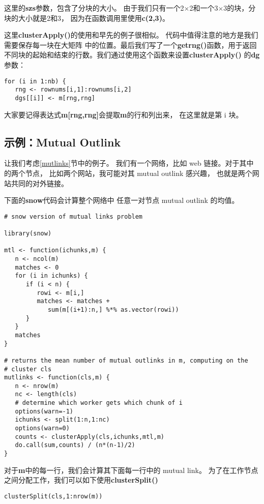 这里的{\bf szs}参数，包含了分块的大小。
由于我们只有一个2$\times$2和一个3$\times$3的块，分块的大小就是2和3，
因为在函数调用里使用{\bf c(2,3)}。

这里{\bf clusterApply()}的使用和早先的例子很相似。
代码中值得注意的地方是我们需要保存每一块在大矩阵
中的位置。最后我们写了一个{\bf getrng()}函数，用于返回
不同块的起始和结束的行数。我们通过使用这个函数来设置{\bf clusterApply()}
的{\bf dg}参数：

\begin{lstlisting}
for (i in 1:nb) {
   rng <- rownums[i,1]:rownums[i,2]
   dgs[[i]] <- m[rng,rng]
\end{lstlisting}

大家要记得表达式{\bf m[rng,rng]}会提取{\bf m}的行和列出来，
在这里就是第 i 块。

\subsection{示例：Mutual Outlink}
\label{rmutlinks}

让我们考虑\ref{mutlinks}节中的例子。
我们有一个网络，比如 web 链接。对于其中的两个节点，
比如两个网站，我可能对其 mutual outlink 感兴趣，
也就是两个网站共同的对外链接。

下面的{\bf snow}代码会计算整个网络中
任意一对节点 mutual outlink 的均值。

\begin{lstlisting}
# snow version of mutual links problem

library(snow)

mtl <- function(ichunks,m) {
   n <- ncol(m)
   matches <- 0
   for (i in ichunks) {
      if (i < n) {
         rowi <- m[i,]
         matches <- matches +
            sum(m[(i+1):n,] %*% as.vector(rowi))
      }
   }
   matches
}

# returns the mean number of mutual outlinks in m, computing on the
# cluster cls
mutlinks <- function(cls,m) {
   n <- nrow(m)
   nc <- length(cls)
   # determine which worker gets which chunk of i
   options(warn=-1)
   ichunks <- split(1:n,1:nc)
   options(warn=0)
   counts <- clusterApply(cls,ichunks,mtl,m)
   do.call(sum,counts) / (n*(n-1)/2)
}
\end{lstlisting}

对于{\bf m}中的每一行，我们会计算其下面每一行中的 mutual link。
为了在工作节点之间分配工作，我们可以如下使用{\bf clusterSplit()}
\begin{lstlisting}
clusterSplit(cls,1:nrow(m))
\end{lstlisting}

